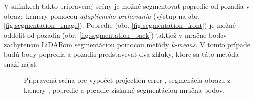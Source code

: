\documentclass[12pt, a4paper]{article}
\begin{document}
V snímkoch takto pripravenej scény je možné segmentovať popredie od pozadia v obraze kamery pomocou \emph{adaptívneho prahovania} (výstup na obr. \ref{fig:segmentation_image}). Popredie (obr. \ref{fig:segmentation_front}) je možné oddeliť od pozadia (obr. \ref{fig:segmentation_back}) taktiež v mračne bodov zachytenom LiDARom segmentáciou pomocou metódy \emph{k-means}. V tomto prípade budú body popredia a pozadia predstavovať dva zhluky, ktoré sa táto metóda snaží nájsť.

\begin{figure}[h]
\center
	\quad
	
	\quad
	
	\caption{Pripravená scéna pre výpočet projection error \protect{}, segmenácia obrazu z kamery \protect{}, popredie \protect{} a pozadie \protect{} získamé segmentáciou mračna bodov.\label{fig:segmentation}}
\end{figure}
\end{document}
